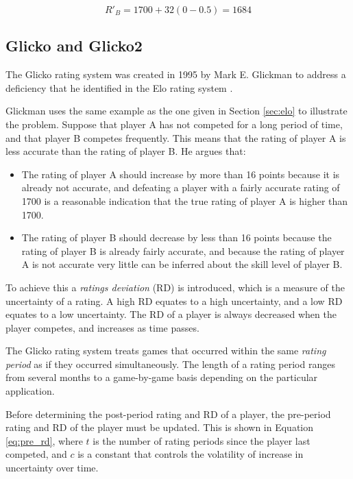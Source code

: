 \begin{equation} \label{eq:update_ex_b}
R'_B = 1700 + 32 \left( 0 - 0.5 \right) = 1684
\end{equation}

\subsection{Glicko and Glicko2}
The Glicko rating system was created in 1995 by Mark E. Glickman to address a deficiency that he identified in the Elo rating system \cite{glicko}.

Glickman uses the same example as the one given in Section \ref{sec:elo} to illustrate the problem.
Suppose that player A has not competed for a long period of time, and that player B competes frequently.
This means that the rating of player A is less accurate than the rating of player B.
He argues that:

\begin{itemize}
	\item{The rating of player A should increase by more than 16 points because it is already not accurate, and defeating a player with a fairly accurate rating of 1700 is a reasonable indication that the true rating of player A is higher than 1700.}
	\item{The rating of player B should decrease by less than 16 points because the rating of player B is already fairly accurate, and because the rating of player A is not accurate very little can be inferred about the skill level of player B.}
\end{itemize}

To achieve this a \emph{ratings deviation} (RD) is introduced, which is a measure of the uncertainty of a rating.
A high RD equates to a high uncertainty, and a low RD equates to a low uncertainty.
The RD of a player is always decreased when the player competes, and increases as time passes.

The Glicko rating system treats games that occurred within the same \emph{rating period} as if they occurred simultaneously.
The length of a rating period ranges from several months to a game-by-game basis depending on the particular application.

Before determining the post-period rating and RD of a player, the pre-period rating and RD of the player must be updated.
This is shown in Equation \ref{eq:pre_rd}, where $t$ is the number of rating periods since the player last competed, and $c$ is a constant that controls the volatility of increase in uncertainty over time.

